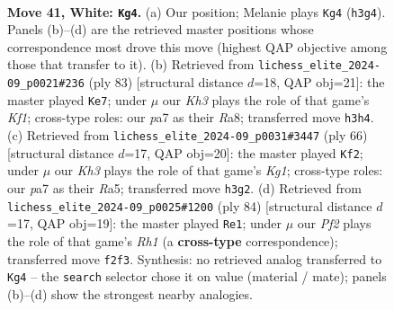 \documentclass[11pt]{article}
\begin{document}
\clearpage

\begin{figure}[p]\centering
\begin{subfigure}{0.46\textwidth}\centering
\resizebox{\linewidth}{!}{%
\newchessgame
\chessboard[
  setfen={7k/p2p4/2p2p2/1r6/1P1P4/7K/5P1P/8 w - - 2 41},
  showmover=false,
  pgfstyle=straightmove, color=movearrow, markmove={h3-g4}
]}
\caption{}
\end{subfigure}\hfill
\begin{subfigure}{0.46\textwidth}\centering
\resizebox{\linewidth}{!}{%
\newchessgame
\chessboard[
  setfen={r4k2/1p1P2p1/1R6/8/7p/1p5P/5KP1/8 b - - 2 42},
  showmover=false,
  pgfstyle=straightmove, color=movearrow, markmove={f8-e7}
]}
\caption{}
\end{subfigure}
\\[4pt]
\begin{subfigure}{0.46\textwidth}\centering
\resizebox{\linewidth}{!}{%
\newchessgame
\chessboard[
  setfen={8/5k1p/4p3/R2pP1P1/4r3/6P1/7P/6K1 w - - 1 34},
  showmover=false,
  pgfstyle=straightmove, color=movearrow, markmove={g1-f2}
]}
\caption{}
\end{subfigure}\hfill
\begin{subfigure}{0.46\textwidth}\centering
\resizebox{\linewidth}{!}{%
\newchessgame
\chessboard[
  setfen={8/5p1k/7p/2r5/2P2p1P/1K6/5PP1/7R w - - 0 43},
  showmover=false,
  pgfstyle=straightmove, color=movearrow, markmove={h1-e1}
]}
\caption{}
\end{subfigure}
\caption{\textbf{Move 41, White: \texttt{Kg4}.} (a) Our position; Melanie plays \texttt{Kg4} (\texttt{h3g4}). Panels (b)--(d) are the retrieved master positions whose correspondence most drove this move (highest QAP objective among those that transfer to it). (b) Retrieved from \texttt{lichess\_elite\_2024-09\_p0021\#236} (ply 83) [structural distance $d$=18, QAP obj=21]: the master played \texttt{Ke7}; under $\mu$ our \emph{Kh3} plays the role of that game's \emph{Kf1}; cross-type roles: our \emph{p}a7 as their \emph{R}a8; transferred move \texttt{h3h4}. (c) Retrieved from \texttt{lichess\_elite\_2024-09\_p0031\#3447} (ply 66) [structural distance $d$=17, QAP obj=20]: the master played \texttt{Kf2}; under $\mu$ our \emph{Kh3} plays the role of that game's \emph{Kg1}; cross-type roles: our \emph{p}a7 as their \emph{R}a5; transferred move \texttt{h3g2}. (d) Retrieved from \texttt{lichess\_elite\_2024-09\_p0025\#1200} (ply 84) [structural distance $d$=17, QAP obj=19]: the master played \texttt{Re1}; under $\mu$ our \emph{Pf2} plays the role of that game's \emph{Rh1} (a \textbf{cross-type} correspondence); transferred move \texttt{f2f3}. Synthesis: no retrieved analog transferred to \texttt{Kg4} -- the \texttt{search} selector chose it on value (material / mate); panels (b)--(d) show the strongest nearby analogies.}
\label{fig:thought-m80}
\end{figure}
\end{document}
